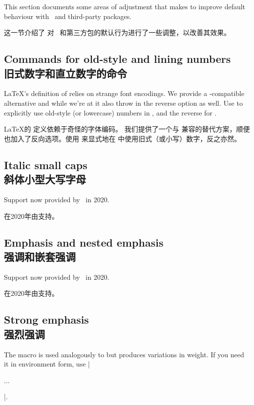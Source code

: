 \documentclass[a4paper]{l3doc}
\begin{document}
This section documents some areas of adjustment that  makes
to improve default behaviour with \LaTeXe\ and third-party packages.

这一节介绍了  对 \LaTeXe\ 和第三方包的默认行为进行了一些调整，以改善其效果。

\subsection{Commands for old-style and lining numbers\\旧式数字和直立数字的命令}

\DescribeMacro{\oldstylenums}
\DescribeMacro{\liningnums}
\LaTeX's definition of  relies on strange font encodings.
We provide a -compatible alternative and while we're at it
also throw in the reverse option as well. Use 
to explicitly use old-style (or lowercase) numbers in , and
the reverse for .

\LaTeX 的  定义依赖于奇怪的字体编码。 我们提供了一个与  兼容的替代方案，顺便也加入了反向选项。使用  来显式地在  中使用旧式（或小写）数字，反之亦然。

\subsection{Italic small caps\\斜体小型大写字母}

Support now provided by \LaTeXe\ in 2020.

在2020年由\LaTeXe 支持。


\subsection{Emphasis and nested emphasis\\强调和嵌套强调}

Support now provided by \LaTeXe\ in 2020.

在2020年由\LaTeXe 支持。

\subsection{Strong emphasis\\强烈强调}

\DescribeMacro{\strong}
\DescribeMacro{\strongenv}
The  macro is used analogously to  but produces variations in weight.
If you need it in environment form, use |\begin{strongenv}...\end{strongenv}|.
\end{document}
